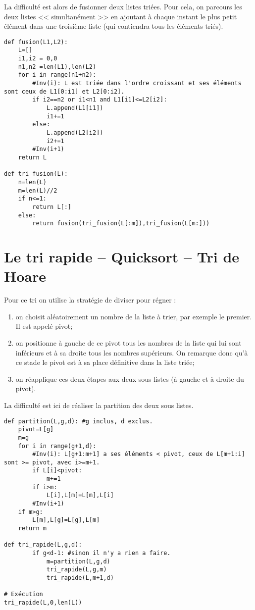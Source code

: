 La difficulté est alors de fusionner deux listes triées. Pour cela, on parcours les deux listes << simultanément >> en ajoutant à chaque instant le plus petit élément dans une troisième liste (qui contiendra tous les éléments triés). 
\begin{lstlisting}	
def fusion(L1,L2):
    L=[]
    i1,i2 = 0,0
    n1,n2 =len(L1),len(L2)
    for i in range(n1+n2):
        #Inv(i): L est triée dans l'ordre croissant et ses éléments sont ceux de L1[0:i1] et L2[0:i2].
        if i2==n2 or i1<n1 and L1[i1]<=L2[i2]:
            L.append(L1[i1])
            i1+=1
        else:
            L.append(L2[i2])
            i2+=1
        #Inv(i+1)
    return L
    
def tri_fusion(L):
    n=len(L)
    m=len(L)//2
    if n<=1:
        return L[:]
    else:
        return fusion(tri_fusion(L[:m]),tri_fusion(L[m:]))
\end{lstlisting}	

\section{Le tri rapide -- Quicksort -- Tri de Hoare}
Pour ce tri on utilise la stratégie de diviser pour régner : 
\begin{enumerate}
\item on choisit aléatoirement un nombre de la liste à trier, par exemple le premier. Il est appelé pivot;
\item on positionne à gauche de ce pivot tous les nombres de la liste qui lui sont inférieurs et à sa droite tous les nombres supérieurs. On remarque donc qu'à ce stade le pivot est à sa place définitive dans la liste triée;
\item on réapplique ces deux étapes aux deux sous listes (à gauche et à droite du pivot). 
\end{enumerate}

La difficulté est ici de réaliser la partition des deux sous listes. 
\begin{lstlisting}	
def partition(L,g,d): #g inclus, d exclus.
    pivot=L[g]
    m=g
    for i in range(g+1,d):
        #Inv(i): L[g+1:m+1] a ses éléments < pivot, ceux de L[m+1:i] sont >= pivot, avec i>=m+1.
        if L[i]<pivot:
            m+=1
        if i>m:
            L[i],L[m]=L[m],L[i]
        #Inv(i+1)
    if m>g:
        L[m],L[g]=L[g],L[m]
    return m

def tri_rapide(L,g,d):
        if g<d-1: #sinon il n'y a rien a faire.
            m=partition(L,g,d)
            tri_rapide(L,g,m)
            tri_rapide(L,m+1,d)

# Exécution 
tri_rapide(L,0,len(L))
\end{lstlisting}	


%


